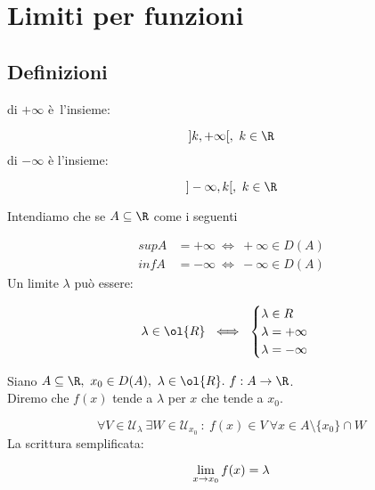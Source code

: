 \documentclass[../analisi.tex]{subfiles}
\begin{document}
\section{Limiti per funzioni}
\subsection{Definizioni}

\begin{defn} 
 di $ + \infty$ è l'insieme:


\begin{equation}
	]k, + \infty [,\ k \in \R
\end{equation}
 di $ - \infty$ è l'insieme:


\begin{equation}
	] - \infty, k [, \ k \in \R
\end{equation}
\end{defn}
Intendiamo che se $ \acr $ come i seguenti


\begin{equation}
	\begin{aligned}
	sup A &= + \infty\ \iff\ + \infty \in D(A)\\
	inf A &= - \infty\ \iff\ - \infty \in D(A)
	\end{aligned}	
\end{equation}
Un limite $\lambda$ può essere:


\begin{equation}
	\lambda \in \ol{R}\ \iff\ 
	\begin{cases}
		\lambda \in R\\
		\lambda = +\infty\\
		\lambda = -\infty
	\end{cases}
\end{equation}

\begin{defn}
Siano $\acr,\ x_0 \in D(A),\ \lambda \in \ol{R}.\ f: A \to \R$.\\
Diremo che $f(x)$ tende a $\lambda$ per $x$ che tende a $x_0$.


\begin{equation}
	\forall V \in \mathcal{U}_\lambda\ \exists W \in \mathcal{U}_{x_0}\ :\
	f(x) \in V\ \forall x \in A \setminus \{ x_0 \}\cap W
\end{equation}
La scrittura semplificata:


\begin{equation}
	\lim \limits_{x \to x_0} f(x) = \lambda
\end{equation}
\end{defn}
\end{document}
